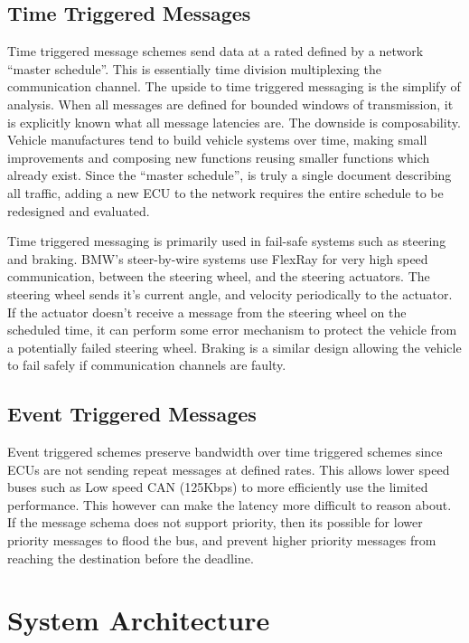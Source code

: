 \documentclass[conference,12pt]{IEEEtran}
\begin{document}
\subsection{Time Triggered Messages}
\label{sec:time_trigger}
Time triggered message schemes send data at a rated defined by a network
``master schedule''. This is essentially time division multiplexing the
communication channel. The upside to time triggered messaging is the simplify
of analysis. When all messages are defined for bounded windows of transmission,
it is explicitly known what all message latencies are.  The downside is
composability. Vehicle manufactures tend to build vehicle systems over time,
making small improvements and composing new functions reusing smaller functions
which already exist. Since the ``master schedule'', is truly a single document
describing all traffic, adding a new ECU to the network requires the entire
schedule to be redesigned and evaluated. 

Time triggered messaging is primarily used in fail-safe systems such as steering
and braking. BMW's steer-by-wire systems use FlexRay for very high speed
communication, between the steering wheel, and the steering actuators. The
steering wheel sends it's current angle, and velocity periodically to the
actuator. If the actuator doesn't receive a message from the steering wheel on
the scheduled time, it can perform some error mechanism to protect the vehicle
from a potentially failed steering wheel.  Braking is a similar design allowing
the vehicle to fail safely if communication channels are faulty. 

\subsection{Event Triggered Messages}
Event triggered schemes preserve bandwidth over time triggered schemes since
ECUs are not sending repeat messages at defined rates. This allows lower speed
buses such as Low speed CAN (125Kbps) to more efficiently use the
limited performance. This however can make the latency more difficult to reason
about. If the message schema does not support priority, then its possible for
lower priority messages to flood the bus, and prevent higher priority messages
from reaching the destination before the deadline. 

\section{System Architecture}
\end{document}
